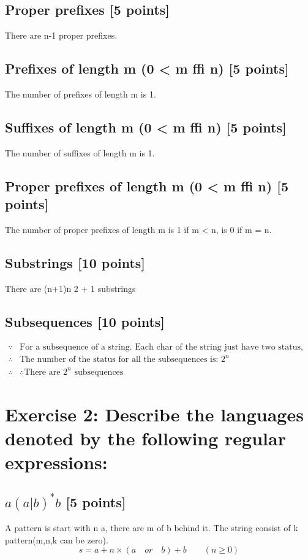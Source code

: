 \documentclass{article}
\begin{document}
        \subsection{Proper prefixes [5 points]}
        There are n-1 proper prefixes.
        \subsection{Prefixes of length m (0 < m ffi n) [5 points]}
        The number of prefixes of length m is 1.
        \subsection{Suffixes of length m (0 < m ffi n) [5 points]}
        The number of suffixes of length m is 1.
        \subsection{Proper prefixes of length m (0 < m ffi n) [5 points]}
        The number of proper prefixes of length m is 1 if m < n, is 0 if m = n.
        \subsection{Substrings [10 points]}
        There are (n+1)n
        2 + 1 substrings
        \subsection{Subsequences [10 points]}
        \begin{align*}
            \because &\text{For a subsequence of a string. Each char of the string just have two status, in the sequence or not in it.}\\
            \therefore &\text{The number of the status for all the subsequences is: } 2^n\\
            \therefore &\text{∴There are } 2^n \text{ subsequences}
        \end{align*}
    \section{Exercise 2: Describe the languages denoted by the following regular expressions:}
        \subsection{$a(a|b)^*b$ [5 points]}
            A pattern is start with n a, there are m of b behind it. The string consist of k pattern(m,n,k can be zero).
            $$s = a + n × (a\quad or\quad b) + b\qquad (n\geq 0)$$
\end{document}
